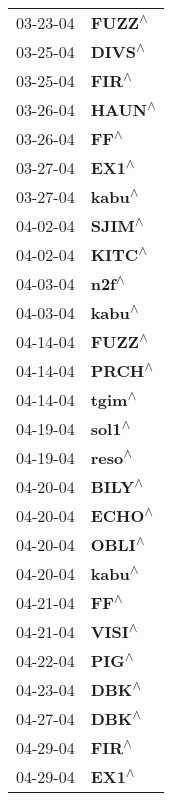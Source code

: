 \begin{supertabular}{p{0.08\textwidth}p{0.2\textwidth}}
 03-23-04 &    \textbf{FUZZ\textsuperscript{$\wedge$}} \\
 03-25-04 &    \textbf{DIVS\textsuperscript{$\wedge$}} \\
 03-25-04 &     \textbf{FIR\textsuperscript{$\wedge$}} \\
 03-26-04 &    \textbf{HAUN\textsuperscript{$\wedge$}} \\
 03-26-04 &      \textbf{FF\textsuperscript{$\wedge$}} \\
 03-27-04 &     \textbf{EX1\textsuperscript{$\wedge$}} \\
 03-27-04 &    \textbf{kabu\textsuperscript{$\wedge$}} \\
 04-02-04 &    \textbf{SJIM\textsuperscript{$\wedge$}} \\
 04-02-04 &    \textbf{KITC\textsuperscript{$\wedge$}} \\
 04-03-04 &     \textbf{n2f\textsuperscript{$\wedge$}} \\
 04-03-04 &    \textbf{kabu\textsuperscript{$\wedge$}} \\
 04-14-04 &    \textbf{FUZZ\textsuperscript{$\wedge$}} \\
 04-14-04 &    \textbf{PRCH\textsuperscript{$\wedge$}} \\
 04-14-04 &    \textbf{tgim\textsuperscript{$\wedge$}} \\
 04-19-04 &    \textbf{sol1\textsuperscript{$\wedge$}} \\
 04-19-04 &    \textbf{reso\textsuperscript{$\wedge$}} \\
 04-20-04 &    \textbf{BILY\textsuperscript{$\wedge$}} \\
 04-20-04 &    \textbf{ECHO\textsuperscript{$\wedge$}} \\
 04-20-04 &    \textbf{OBLI\textsuperscript{$\wedge$}} \\
 04-20-04 &    \textbf{kabu\textsuperscript{$\wedge$}} \\
 04-21-04 &      \textbf{FF\textsuperscript{$\wedge$}} \\
 04-21-04 &    \textbf{VISI\textsuperscript{$\wedge$}} \\
 04-22-04 &     \textbf{PIG\textsuperscript{$\wedge$}} \\
 04-23-04 &     \textbf{DBK\textsuperscript{$\wedge$}} \\
 04-27-04 &     \textbf{DBK\textsuperscript{$\wedge$}} \\
 04-29-04 &     \textbf{FIR\textsuperscript{$\wedge$}} \\
 04-29-04 &     \textbf{EX1\textsuperscript{$\wedge$}} \\

\end{supertabular}
